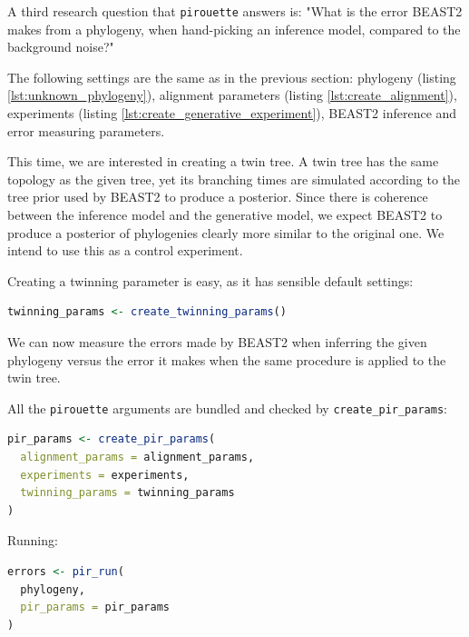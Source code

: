 \documentclass{article}
\newcommand{\richel}[1]{\textcolor{orange}{\textbf{[RB: #1]}}}
\begin{document}
A third research question that \verb;pirouette; answers is:
"What is the error BEAST2 makes from a phylogeny, 
when hand-picking an inference model, compared to the background noise?"

The following settings are the same as in the previous section:
phylogeny (listing \ref{lst:unknown_phylogeny}), 
alignment parameters (listing \ref{lst:create_alignment}), 
experiments (listing \ref{lst:create_generative_experiment}),
BEAST2 inference and error measuring parameters.

This time, we are interested in creating a twin tree. A twin tree
has the same topology as the given tree, yet its branching times are simulated according to the tree prior used by BEAST2 to produce a posterior. Since there is coherence between the inference model and the generative model, we expect BEAST2 to produce a posterior of phylogenies clearly more similar to the original one. We intend to use this as a control experiment.

Creating a twinning parameter is easy, as it has sensible default settings:

\begin{lstlisting}[language=R, floatplacement=H, frame=single]
twinning_params <- create_twinning_params()
\end{lstlisting}

We can now measure the errors made by BEAST2 when inferring the given phylogeny versus the error it makes when the same procedure is applied to the twin tree.

All the \verb;pirouette; arguments are bundled and checked by \verb;create_pir_params;:

\begin{lstlisting}[language=R, floatplacement=H, frame=single]
pir_params <- create_pir_params(
  alignment_params = alignment_params,
  experiments = experiments,
  twinning_params = twinning_params
)
\end{lstlisting}

Running:

\begin{lstlisting}[language=R, floatplacement=H, frame=single]
errors <- pir_run(
  phylogeny,
  pir_params = pir_params
)
\end{lstlisting}
\end{document}
